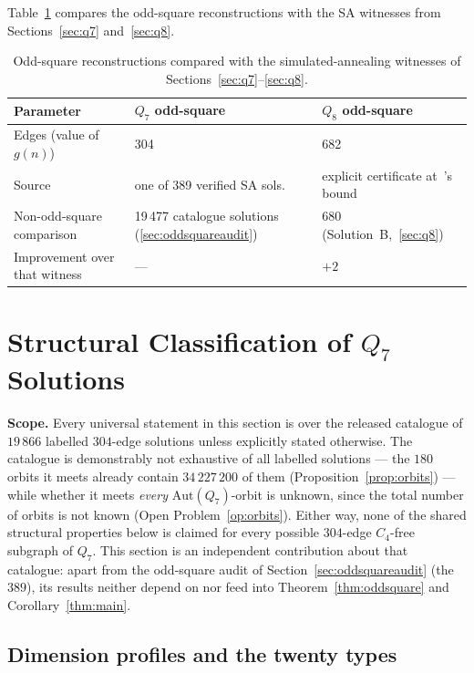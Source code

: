 \documentclass[12pt]{article}
\begin{document}
Table~\ref{tab:oddsquare} compares the odd-square reconstructions with the SA
witnesses from Sections~\ref{sec:q7} and~\ref{sec:q8}.

\begin{table}[ht]
\centering\small
\caption{Odd-square reconstructions compared with the simulated-annealing
  witnesses of Sections~\ref{sec:q7}--\ref{sec:q8}.}
\label{tab:oddsquare}\medskip
\begin{tabular}{@{}lp{4.3cm}p{4.3cm}@{}}
\toprule
Parameter & $Q_7$ odd-square & $Q_8$ odd-square\\
\midrule
Edges (value of $g(n)$) & 304 & 682\\
Source & one of 389 verified SA sols. & explicit certificate at~\cite{MPR95}'s bound\\
Non-odd-square comparison & 19\,477 catalogue solutions (\ref{sec:oddsquareaudit}) & 680 (Solution~B,~\ref{sec:q8})\\
Improvement over that witness & --- & $+2$\\
\bottomrule
\end{tabular}
\end{table}

\section{Structural Classification of \texorpdfstring{$Q_7$}{Q7} Solutions}\label{sec:structure}
\noindent\textbf{Scope.} Every universal statement in this section is over
the released catalogue of $19\,866$ labelled $304$-edge solutions unless
explicitly stated otherwise. The catalogue is demonstrably not exhaustive of
all labelled solutions --- the $180$ orbits it meets already contain
$34\,227\,200$ of them (Proposition~\ref{prop:orbits}) --- while whether it
meets \emph{every} $\mathrm{Aut}(Q_7)$-orbit is unknown, since the total
number of orbits is not known (Open Problem~\ref{op:orbits}). Either way,
none of the shared structural properties below is claimed for every possible
$304$-edge $C_4$-free subgraph of $Q_7$. This section is an independent
contribution about that catalogue: apart from the odd-square audit of
Section~\ref{sec:oddsquareaudit} (the $389$), its results neither depend
on nor feed into Theorem~\ref{thm:oddsquare} and Corollary~\ref{thm:main}.


\subsection{Dimension profiles and the twenty types}\label{sec:profiles}
\end{document}
